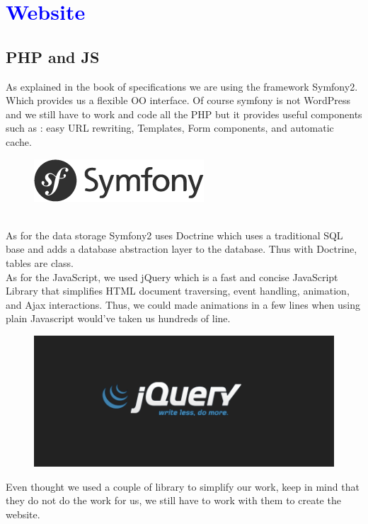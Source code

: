 \documentclass[article]{report} %
\begin{document}
\chapter{\textcolor{blue}{Website}}
				\section{PHP and JS}
					As explained in the book of specifications we are using the framework Symfony2. Which provides us a flexible OO interface. Of course symfony is not WordPress and we still have to work and code all the PHP but it provides useful components such as : easy URL rewriting, Templates, Form components, and automatic cache. \\
				\begin{figure}[h]
					\includegraphics[scale=1.25]{Images/logo_symfony.png}
				\end{figure}
\\

As for the data storage Symfony2 uses Doctrine which uses a traditional SQL base and adds a database abstraction layer to the database. Thus with Doctrine, tables are class.\\

					As for the JavaScript, we used jQuery which is a fast and concise JavaScript Library that simplifies HTML document traversing, event handling, animation, and Ajax interactions. Thus, we could made animations in a few lines when using plain Javascript would've taken us hundreds of line.
\newpage
				\begin{figure}[h]
					\includegraphics[scale=1]{Images/jquery.png}
				\end{figure}
					Even thought we used a couple of library to simplify our work, keep in mind that they do not do the work for us, we still have to work with them to create the website.\\
 
\end{document}
